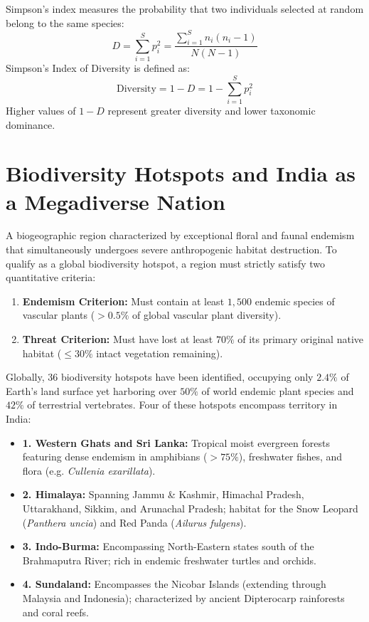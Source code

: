 \begin{keyequation}
Simpson's index measures the probability that two individuals selected at random belong to the same species:
\begin{equation}
D = \sum_{i=1}^S p_i^2 = \frac{\sum_{i=1}^S n_i(n_i - 1)}{N(N - 1)}
\end{equation}
Simpson's Index of Diversity is defined as:
\begin{equation}
\text{Diversity} = 1 - D = 1 - \sum_{i=1}^S p_i^2
\end{equation}
Higher values of $1 - D$ represent greater diversity and lower taxonomic dominance.
\end{keyequation}

\section{Biodiversity Hotspots and India as a Megadiverse Nation}
\begin{definition}
A biogeographic region characterized by exceptional floral and faunal endemism that simultaneously undergoes severe anthropogenic habitat destruction. To qualify as a global biodiversity hotspot, a region must strictly satisfy two quantitative criteria:
\begin{enumerate}
    \item \textbf{Endemism Criterion:} Must contain at least $1{,}500$ endemic species of vascular plants ($>0.5\%$ of global vascular plant diversity).
    \item \textbf{Threat Criterion:} Must have lost at least $70\%$ of its primary original native habitat ($\le 30\%$ intact vegetation remaining).
\end{enumerate}
\end{definition}

Globally, 36 biodiversity hotspots have been identified, occupying only $2.4\%$ of Earth's land surface yet harboring over $50\%$ of world endemic plant species and $42\%$ of terrestrial vertebrates. Four of these hotspots encompass territory in India:
\begin{itemize}[leftmargin=1.5em]
    \item \textbf{1. Western Ghats and Sri Lanka:} Tropical moist evergreen forests featuring dense endemism in amphibians ($>75\%$), freshwater fishes, and flora (e.g. \textit{Cullenia exarillata}).
    \item \textbf{2. Himalaya:} Spanning Jammu \& Kashmir, Himachal Pradesh, Uttarakhand, Sikkim, and Arunachal Pradesh; habitat for the Snow Leopard (\textit{Panthera uncia}) and Red Panda (\textit{Ailurus fulgens}).
    \item \textbf{3. Indo-Burma:} Encompassing North-Eastern states south of the Brahmaputra River; rich in endemic freshwater turtles and orchids.
    \item \textbf{4. Sundaland:} Encompasses the Nicobar Islands (extending through Malaysia and Indonesia); characterized by ancient Dipterocarp rainforests and coral reefs.
\end{itemize}


